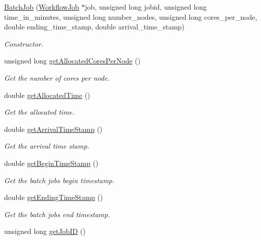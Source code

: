 \begin{DoxyCompactItemize}
\item 
\hyperlink{classwrench_1_1_batch_job_ae95376b89b37aa8e1c6c91fecb6082c8}{Batch\+Job} (\hyperlink{classwrench_1_1_workflow_job}{Workflow\+Job} $\ast$job, unsigned long jobid, unsigned long time\+\_\+in\+\_\+minutes, unsigned long number\+\_\+nodes, unsigned long cores\+\_\+per\+\_\+node, double ending\+\_\+time\+\_\+stamp, double arrival\+\_\+time\+\_\+stamp)
\begin{DoxyCompactList}\small\item\em Constructor. \end{DoxyCompactList}\item 
unsigned long \hyperlink{classwrench_1_1_batch_job_a1c6f9da692d32e1ecc8e0e4beda76066}{get\+Allocated\+Cores\+Per\+Node} ()
\begin{DoxyCompactList}\small\item\em Get the number of cores per node. \end{DoxyCompactList}\item 
double \hyperlink{classwrench_1_1_batch_job_a62b2b87b1f2b494d2598b30c3193d6d1}{get\+Allocated\+Time} ()
\begin{DoxyCompactList}\small\item\em Get the allocated time. \end{DoxyCompactList}\item 
double \hyperlink{classwrench_1_1_batch_job_a287fb8f69b4fecd1608cce0845f70951}{get\+Arrival\+Time\+Stamp} ()
\begin{DoxyCompactList}\small\item\em Get the arrival time stamp. \end{DoxyCompactList}\item 
double \hyperlink{classwrench_1_1_batch_job_ab0c6c2e27d347dadb07e57096470076c}{get\+Begin\+Time\+Stamp} ()
\begin{DoxyCompactList}\small\item\em Get the batch job\textquotesingle{}s begin timestamp. \end{DoxyCompactList}\item 
double \hyperlink{classwrench_1_1_batch_job_a654473de57c5827afa7ded5a0b3f2226}{get\+Ending\+Time\+Stamp} ()
\begin{DoxyCompactList}\small\item\em Get the batch job\textquotesingle{}s end timestamp. \end{DoxyCompactList}\item 
unsigned long \hyperlink{classwrench_1_1_batch_job_add51419332d7cd0bec2f6ed3db77a563}{get\+Job\+ID} ()

\end{DoxyCompactItemize}
